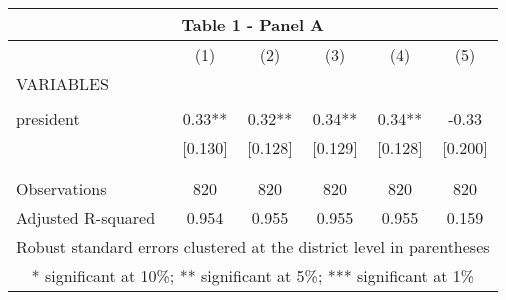 \begin{tabular}{lccccc}
\multicolumn{6}{c}{Table 1 - Panel A} \\ \hline
 & (1) & (2) & (3) & (4) & (5) \\
VARIABLES &  &  &  &  &  \\ \hline
 &  &  &  &  &  \\
president & 0.33** & 0.32** & 0.34** & 0.34** & -0.33 \\
 & [0.130] & [0.128] & [0.129] & [0.128] & [0.200] \\
 &  &  &  &  &  \\
 &  &  &  &  &  \\
Observations & 820 & 820 & 820 & 820 & 820 \\
 Adjusted R-squared & 0.954 & 0.955 & 0.955 & 0.955 & 0.159 \\ \hline
\multicolumn{6}{c}{ Robust standard errors clustered at the district level in parentheses} \\
\multicolumn{6}{c}{ * significant at 10\%; ** significant at 5\%; *** significant at 1\%} \\
\end{tabular}
